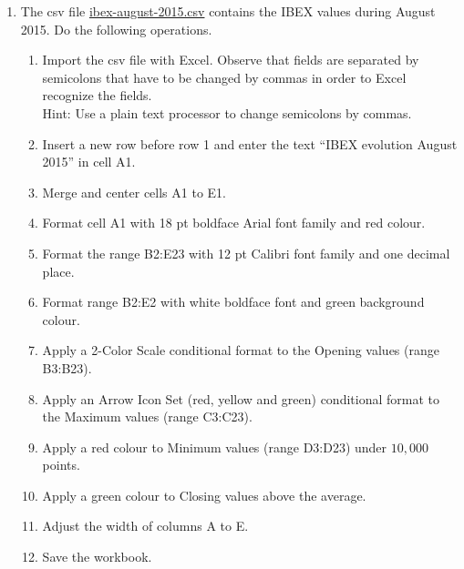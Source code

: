\begin{enumerate}[leftmargin=*]
\item The csv file
\href{http://aprendeconalf.es/office/excel/exercises/introduction/ibex-august-2015.csv}{\textsf{ibex-august-2015.csv}}
contains the IBEX values during August 2015.
Do the following operations. 
\begin{enumerate}
\item Import the csv file with Excel.
Observe that fields are separated by semicolons that have to be changed by commas in order to Excel recognize
the fields.\\
Hint: Use a plain text processor to change semicolons by commas.  
\item Insert a new row before row 1 and enter the text ``IBEX evolution August 2015'' in cell A1.
\item Merge and center cells A1 to E1.
\item Format cell A1 with 18 pt boldface Arial font family and red colour.
\item Format the range B2:E23 with 12 pt Calibri font family and one decimal place. 
\item Format range B2:E2 with white boldface font and green background colour. 
\item Apply a 2-Color Scale conditional format to the Opening values (range B3:B23).
\item Apply an Arrow Icon Set (red, yellow and green) conditional format to the Maximum values (range C3:C23).
\item Apply a red colour to Minimum values (range D3:D23) under $10,000$ points.
\item Apply a green colour to Closing values above the average.
\item Adjust the width of columns A to E.
\item Save the workbook. 
\end{enumerate}


\end{enumerate}